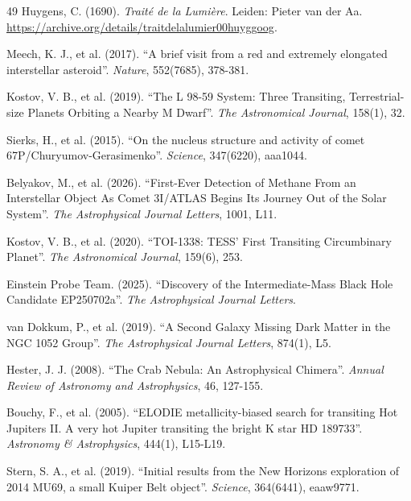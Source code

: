 \documentclass[11pt, a4paper]{article}
\begin{document}
\begin{thebibliography}{49}
  Huygens, C. (1690). \textit{Traité de la Lumière}. Leiden: Pieter van der Aa.
  \url{https://archive.org/details/traitdelalumier00huyggoog}.

  Meech, K. J., et al. (2017). ``A brief visit from a red and extremely elongated interstellar asteroid''. \textit{Nature}, 552(7685), 378-381.

  Kostov, V. B., et al. (2019). ``The L 98-59 System: Three Transiting, Terrestrial-size Planets Orbiting a Nearby M Dwarf''. \textit{The Astronomical Journal}, 158(1), 32.

  Sierks, H., et al. (2015). ``On the nucleus structure and activity of comet 67P/Churyumov-Gerasimenko''. \textit{Science}, 347(6220), aaa1044.

  Belyakov, M., et al. (2026). ``First-Ever Detection of Methane From an Interstellar Object As Comet 3I/ATLAS Begins Its Journey Out of the Solar System''. \textit{The Astrophysical Journal Letters}, 1001, L11.

  Kostov, V. B., et al. (2020). ``TOI-1338: TESS' First Transiting Circumbinary Planet''. \textit{The Astronomical Journal}, 159(6), 253.

  Einstein Probe Team. (2025). ``Discovery of the Intermediate-Mass Black Hole Candidate EP250702a''. \textit{The Astrophysical Journal Letters}.

  van Dokkum, P., et al. (2019). ``A Second Galaxy Missing Dark Matter in the NGC 1052 Group''. \textit{The Astrophysical Journal Letters}, 874(1), L5.

  Hester, J. J. (2008). ``The Crab Nebula: An Astrophysical Chimera''. \textit{Annual Review of Astronomy and Astrophysics}, 46, 127-155.

  Bouchy, F., et al. (2005). ``ELODIE metallicity-biased search for transiting Hot Jupiters II. A very hot Jupiter transiting the bright K star HD 189733''. \textit{Astronomy \& Astrophysics}, 444(1), L15-L19.

  Stern, S. A., et al. (2019). ``Initial results from the New Horizons exploration of 2014 MU69, a small Kuiper Belt object''. \textit{Science}, 364(6441), eaaw9771.


\end{thebibliography}
\end{document}
